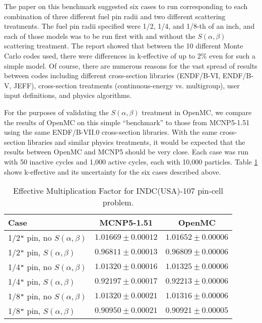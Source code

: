 \documentclass{elsarticle}
\begin{document}
The paper on this benchmark suggested six cases to run corresponding to each
combination of three different fuel pin radii and two different scattering
treatments. The fuel pin radii specified were 1/2, 1/4, and 1/8-th of an inch,
and each of those models was to be run first with and without the
$S(\alpha,\beta)$ scattering treatment. The report showed that between the 10
different Monte Carlo codes used, there were differences in k-effective of up to
2\% even for such a simple model. Of course, there are numerous reasons for the
vast spread of results between codes including different cross-section libraries
(ENDF/B-VI, ENDF/B-V, JEFF), cross-section treatments (continuous-energy
vs. multigroup), user input definitions, and physics algorithms.

For the purposes of validating the $S(\alpha,\beta)$ treatment in OpenMC, we
compare the results of OpenMC on this simple ``benchmark'' to those from
MCNP5-1.51 using the same ENDF/B-VII.0 cross-section libraries. With the same
cross-section libraries and similar physics treatments, it would be expected
that the results between OpenMC and MCNP5 should be very close. Each case was
run with 50 inactive cycles and 1,000 active cycles, each with 10,000
particles. Table \ref{tab:pincell} shows k-effective and its uncertainty for the
six cases described above.

\begin{table}
  \caption{Effective Multiplication Factor for INDC(USA)-107 pin-cell problem.}
  \label{tab:pincell}
  \begin{center}
  \begin{tabular}{ l c c }
    \hline
    Case & MCNP5-1.51 & OpenMC \\
    \hline
    1/2\verb+"+ pin, no $S(\alpha,\beta)$ & $1.01669 \pm 0.00012$ & $1.01652 \pm 0.00006$ \\
    1/2\verb+"+ pin, $S(\alpha,\beta)$    & $0.96811 \pm 0.00013$ & $0.96809 \pm 0.00006$ \\
    1/4\verb+"+ pin, no $S(\alpha,\beta)$ & $1.01320 \pm 0.00016$ & $1.01325 \pm 0.00006$ \\
    1/4\verb+"+ pin, $S(\alpha,\beta)$    & $0.92197 \pm 0.00017$ & $0.92213 \pm 0.00006$ \\
    1/8\verb+"+ pin, no $S(\alpha,\beta)$ & $1.01320 \pm 0.00021$ & $1.01316 \pm 0.00006$ \\
    1/8\verb+"+ pin, $S(\alpha,\beta)$    & $0.90950 \pm 0.00021$ & $0.90921 \pm 0.00005$ \\
    \hline
  \end{tabular}
  \end{center}
\end{table}
\end{document}
